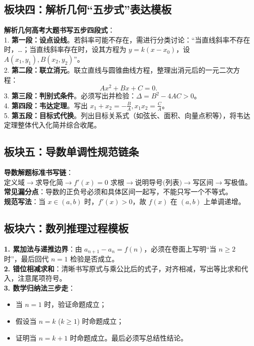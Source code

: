 \documentclass[11pt,a4paper]{ctexart}
\begin{document}
\newpage

\subsection{板块四：解析几何“五步式”表达模板}
\begin{decisionscan}
  \textbf{解析几何高考大题书写五步四段式}：\\
  1. \textbf{第一段：设点设线}。若斜率可能不存在，需进行分类讨论：“当直线斜率不存在时，\dots；当直线斜率存在时，设其方程为 \(y = k(x-x_0)\)，设 \(A(x_1, y_1), B(x_2, y_2)\)”。\\
  2. \textbf{第二段：联立消元}。联立直线与圆锥曲线方程，整理出消元后的一元二次方程：
  \[
    Ax^2 + Bx + C = 0.
  \]
  3. \textbf{第三段：判别式条件}。必须写出并检验：\(\Delta = B^2 - 4AC > 0\)。\\
  4. \textbf{第四段：韦达定理}。写出 \(x_1+x_2 = -\frac{B}{A}, x_1x_2 = \frac{C}{A}\)。\\
  5. \textbf{第五段：目标式代换}。列出目标关系式（如弦长、面积、向量点积等），将韦达定理整体代入化简并综合收尾。
\end{decisionscan}

\subsection{板块五：导数单调性规范链条}
\begin{decisionscan}
  \textbf{导数解题标准书写链}：\\
  \(\boxed{\text{定义域}} \rightarrow \boxed{\text{求导化简}} \rightarrow \boxed{f'(x)=0 \text{ 求根}} \rightarrow \boxed{\text{说明导号(列表)}} \rightarrow \boxed{\text{写区间}} \rightarrow \boxed{\text{写极值}}\)。\\
  \textbf{常见漏分点}：导数的正负号必须和具体区间一起写，不能只写一个不等式。\\
  \textbf{规范写法}：当 \(x \in (a, b)\) 时，\(f'(x) > 0\)，故 \(f(x)\) 在 \((a, b)\) 上单调递增。
\end{decisionscan}

\subsection{板块六：数列推理过程模板}
\begin{decisionscan}
  \textbf{1. 累加法与递推边界}：由 \(a_{n+1} - a_n = f(n)\)，必须在卷面上写明“当 \(n \ge 2\) 时”，最后回代 \(n=1\) 检验是否成立。\\
  \textbf{2. 错位相减求和}：清晰书写原式与乘公比后的式子，对齐相减，写出等比求和代入，注意尾项符号。\\
  \textbf{3. 数学归纳法三步走}：
  \begin{itemize}[leftmargin=1.5em, itemsep=0em, topsep=0.1em]
    \item 当 \(n = 1\) 时，验证命题成立；
    \item 假设当 \(n = k\) (\(k \ge 1\)) 时命题成立；
    \item 证明当 \(n = k+1\) 时命题成立。最后必须写总结性结论。
  \end{itemize}
\end{decisionscan}
\end{document}
